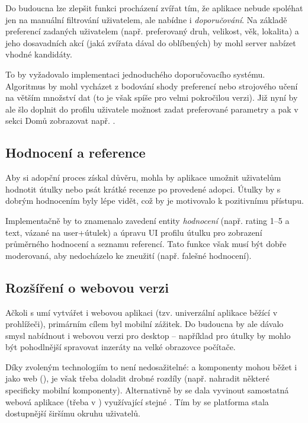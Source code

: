 \documentclass[czech, bp, kiv, he, iso690numb, pdf]{fasthesis}
\begin{document}
    Do budoucna lze zlepšit funkci procházení zvířat tím, že aplikace nebude spoléhat jen na manuální filtrování uživatelem, ale nabídne i \textit{doporučování}. Na základě preferencí zadaných uživatelem (např. preferovaný druh, velikost, věk, lokalita) a jeho dosavadních akcí (jaká zvířata dával do oblíbených) by mohl server nabízet vhodné kandidáty.

    To by vyžadovalo implementaci jednoduchého doporučovacího systému. Algoritmus by mohl vycházet z bodování shody preferencí nebo strojového učení na větším množství dat (to je však spíše pro velmi pokročilou verzi). Již nyní by ale šlo doplnit do profilu uživatele možnost zadat preferované parametry a pak v sekci Domů zobrazovat např. .

    \subsection*{Hodnocení a reference}

    Aby si adopční proces získal důvěru, mohla by aplikace umožnit uživatelům hodnotit útulky nebo psát krátké recenze po provedené adopci. Útulky by s dobrým hodnocením byly lépe vidět, což by je motivovalo k pozitivnímu přístupu.

    Implementačně by to znamenalo zavedení entity \textit{hodnocení} (např. rating 1–5 a text, vázané na user+útulek) a úpravu UI profilu útulku pro zobrazení průměrného hodnocení a seznamu referencí. Tato funkce však musí být dobře moderovaná, aby nedocházelo ke zneužití (např. falešné hodnocení).

    \subsection*{Rozšíření o webovou verzi}

    Ačkoli  s  umí vytvářet i webovou aplikaci (tzv. univerzální aplikace běžící v prohlížeči), primárním cílem byl mobilní zážitek. Do budoucna by ale dávalo smysl nabídnout i webovou verzi pro desktop – například pro útulky by mohlo být pohodlnější spravovat inzeráty na velké obrazovce počítače.

    Díky zvoleným technologiím to není nedosažitelné:  a komponenty mohou běžet i jako web (), je však třeba doladit drobné rozdíly (např. nahradit některé specificky mobilní komponenty). Alternativně by se dala vyvinout samostatná webová aplikace (třeba v ) využívající stejné . Tím by se platforma stala dostupnější širšímu okruhu uživatelů.
\end{document}

